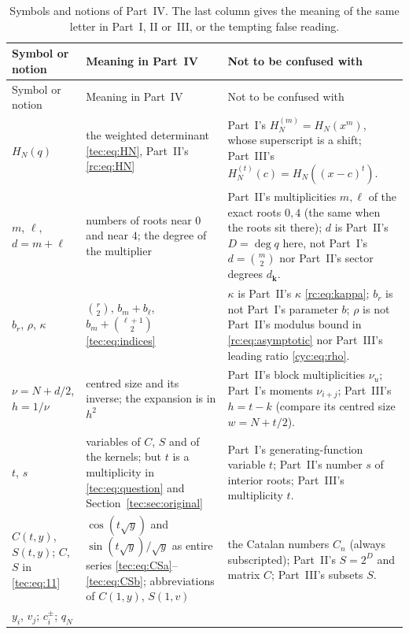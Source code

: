 \documentclass[11pt,a4paper]{article}
\numberwithin{equation}{section}
\theoremstyle{definition}
\theoremstyle{remark}
\newcommand{\bk}{\boldsymbol{k}}
\newcommand{\cH}[2]{H_{#1}^{(#2)}}
\begin{document}
\begingroup\small
\renewcommand{\arraystretch}{1.15}
\begin{longtable}{@{}>{\raggedright}p{}>{\raggedright}p{}>{\raggedright\arraybackslash}p{}@{}}
\caption{Symbols and notions of Part~IV.  The last column gives the
meaning of the same letter in Part~I, II or~III, or the tempting false
reading.}\label{tec:tab:notation}\\
\toprule
Symbol or notion & Meaning in Part~IV & Not to be confused with\\
\midrule
\endfirsthead
\toprule
Symbol or notion & Meaning in Part~IV & Not to be confused with\\
\midrule
\endhead
\bottomrule
\endfoot
$H_N(q)$
 & the weighted determinant \eqref{tec:eq:HN}, Part~II's \eqref{rc:eq:HN}
 & Part~I's $H_N^{(m)}=H_N(x^m)$, whose superscript is a shift; Part~III's
   $\cH Nt(c)=H_N((x-c)^t)$.\\
$m$, $\ell$, $d=m+\ell$
 & numbers of roots near $0$ and near $4$; the degree of the multiplier
 & Part~II's multiplicities $m,\ell$ of the exact roots $0,4$ (the same when
   the roots sit there); $d$ is Part~II's $D=\deg q$ here, not Part~I's
   $d=\binom m2$ nor Part~II's sector degrees $d_{\bk}$.\\
$b_r$, $\rho$, $\kappa$
 & $\binom r2$, $b_m+b_\ell$, $b_m+\binom{\ell+1}2$ \eqref{tec:eq:indices}
 & $\kappa$ is Part~II's $\kappa$ \eqref{rc:eq:kappa}; $b_r$ is not
   Part~I's parameter $b$; $\rho$ is not Part~II's modulus bound in
   \eqref{rc:eq:asymptotic} nor Part~III's leading ratio
   \eqref{cyc:eq:rho}.\\
$\nu=N+d/2$, $h=1/\nu$
 & centred size and its inverse; the expansion is in $h^2$
 & Part~II's block multiplicities $\nu_u$; Part~I's moments $\nu_{i+j}$;
   Part~III's $h=t-k$ (compare its centred size $w=N+t/2$).\\
$t$, $s$
 & variables of $C$, $S$ and of the kernels; but $t$ is a multiplicity in
   \eqref{tec:eq:question} and Section~\ref{tec:sec:original}
 & Part~I's generating-function variable $t$; Part~II's number $s$ of
   interior roots; Part~III's multiplicity $t$.\\
$C(t,y)$, $S(t,y)$; $C$, $S$ in \eqref{tec:eq:11}
 & $\cos(t\sqrt y)$ and $\sin(t\sqrt y)/\sqrt y$ as entire series
   \eqref{tec:eq:CSa}--\eqref{tec:eq:CSb}; abbreviations of $C(1,y)$, $S(1,v)$
 & the Catalan numbers $C_n$ (always subscripted); Part~II's $S=2^D$ and
   matrix $C$; Part~III's subsets $S$.\\
$y_i$, $v_j$; $c_i^\pm$; $q_N$

\end{longtable}
\end{document}
